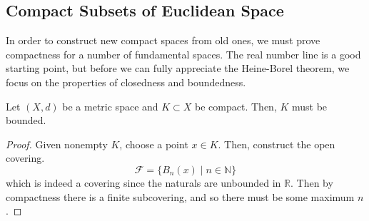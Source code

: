 \subsection{Compact Subsets of Euclidean Space}

  In order to construct new compact spaces from old ones, we must prove compactness for a number of fundamental spaces. The real number line is a good starting point, but before we can fully appreciate the Heine-Borel theorem, we focus on the properties of closedness and boundedness. 

  \begin{theorem}
    Let $(X, d)$ be a metric space and $K \subset X$ be compact. Then, $K$ must be bounded. 
  \end{theorem} 
  \begin{proof}
    Given nonempty $K$, choose a point $x \in K$. Then, construct the open covering. 
    \begin{equation}
      \mathcal{F} = \{ B_n (x) \mid n \in \mathbb{N} \}
    \end{equation}
    which is indeed a covering since the naturals are unbounded in $\mathbb{R}$. Then by compactness there is a finite subcovering, and so there must be some maximum $n$. 
  \end{proof}

